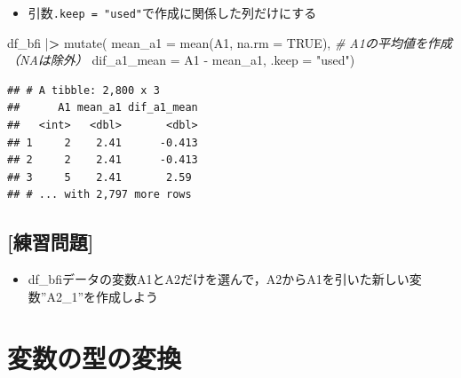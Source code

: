 \documentclass[
  xelatex,ja=standard, b5paper]{bxjsbook}
\newenvironment{Shaded}{\begin{snugshade}}{\end{snugshade}}
\newcommand{\AttributeTok}[1]{\textcolor[rgb]{0.77,0.63,0.00}{#1}}
\newcommand{\CommentTok}[1]{\textcolor[rgb]{0.56,0.35,0.01}{\textit{#1}}}
\newcommand{\ConstantTok}[1]{\textcolor[rgb]{0.00,0.00,0.00}{#1}}
\newcommand{\ErrorTok}[1]{\textcolor[rgb]{0.64,0.00,0.00}{\textbf{#1}}}
\newcommand{\FunctionTok}[1]{\textcolor[rgb]{0.00,0.00,0.00}{#1}}
\newcommand{\NormalTok}[1]{#1}
\newcommand{\SpecialCharTok}[1]{\textcolor[rgb]{0.00,0.00,0.00}{#1}}
\newcommand{\StringTok}[1]{\textcolor[rgb]{0.31,0.60,0.02}{#1}}
\providecommand{\tightlist}{%
  \setlength{\itemsep}{0pt}\setlength{\parskip}{0pt}}
\begin{document}
\begin{itemize}
\tightlist
\item
  引数\texttt{.keep\ =\ "used"}で作成に関係した列だけにする
\end{itemize}

\begin{Shaded}
\begin{Highlighting}[]
\NormalTok{df\_bfi }\SpecialCharTok{|}\ErrorTok{\textgreater{}} 
  \FunctionTok{mutate}\NormalTok{(}
    \AttributeTok{mean\_a1 =} \FunctionTok{mean}\NormalTok{(A1, }\AttributeTok{na.rm =} \ConstantTok{TRUE}\NormalTok{), }\CommentTok{\# A1の平均値を作成（NAは除外）}
    \AttributeTok{dif\_a1\_mean =}\NormalTok{ A1 }\SpecialCharTok{{-}}\NormalTok{ mean\_a1,}
    \AttributeTok{.keep =} \StringTok{"used"}\NormalTok{) }
\end{Highlighting}
\end{Shaded}

\begin{verbatim}
## # A tibble: 2,800 x 3
##      A1 mean_a1 dif_a1_mean
##   <int>   <dbl>       <dbl>
## 1     2    2.41      -0.413
## 2     2    2.41      -0.413
## 3     5    2.41       2.59 
## # ... with 2,797 more rows
\end{verbatim}

\hypertarget{ux7df4ux7fd2ux554fux984c-9}{%
\subsection{{[}練習問題{]}}\label{ux7df4ux7fd2ux554fux984c-9}}

\begin{itemize}
\tightlist
\item
  df\_bfiデータの変数A1とA2だけを選んで，A2からA1を引いた新しい変数''A2\_1''を作成しよう
\end{itemize}

\hypertarget{mu-kata}{%
\section{変数の型の変換}\label{mu-kata}}
\end{document}
